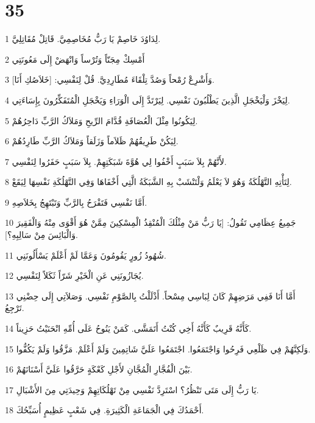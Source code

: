 \chapter{35}

\par 1 لِدَاوُدَ خَاصِمْ يَا رَبُّ مُخَاصِمِيَّ. قَاتِلْ مُقَاتِلِيَّ.
\par 2 أَمْسِكْ مِجَنّاً وَتُرْساً وَانْهَضْ إِلَى مَعُونَتِي
\par 3 وَأَشْرِعْ رُمْحاً وَصُدَّ تِلْقَاءَ مُطَارِدِيَّ. قُلْ لِنَفْسِي: [خَلاَصُكِ أَنَا].
\par 4 لِيَخْزَ وَلْيَخْجَلِ الَّذِينَ يَطْلُبُونَ نَفْسِي. لِيَرْتَدَّ إِلَى الْوَرَاءِ وَيَخْجَلِ الْمُتَفَكِّرُونَ بِإِسَاءَتِي.
\par 5 لِيَكُونُوا مِثْلَ الْعُصَافَةِ قُدَّامَ الرِّيحِ وَمَلاَكُ الرَّبِّ دَاحِرُهُمْ.
\par 6 لِيَكُنْ طَرِيقُهُمْ ظَلاَماً وَزَلَقاً وَمَلاَكُ الرَّبِّ طَارِدُهُمْ.
\par 7 لأَنَّهُمْ بِلاَ سَبَبٍ أَخْفُوا لِي هُوَّةَ شَبَكَتِهِمْ. بِلاَ سَبَبٍ حَفَرُوا لِنَفْسِي.
\par 8 لِتَأْتِهِ التَّهْلُكَةُ وَهُوَ لاَ يَعْلَمُ وَلْتَنْشَبْ بِهِ الشَّبَكَةُ الَّتِي أَخْفَاهَا وَفِي التَّهْلُكَةِ نَفْسِهَا لِيَقَعْ.
\par 9 أَمَّا نَفْسِي فَتَفْرَحُ بِالرَّبِّ وَتَبْتَهِجُ بِخَلاَصِهِ.
\par 10 جَمِيعُ عِظَامِي تَقُولُ: [يَا رَبُّ مَنْ مِثْلُكَ الْمُنْقِذُ الْمِسْكِينَ مِمَّنْ هُوَ أَقْوَى مِنْهُ وَالْفَقِيرَ وَالْبَائِسَ مِنْ سَالِبِهِ؟].
\par 11 شُهُودُ زُورٍ يَقُومُونَ وَعَمَّا لَمْ أَعْلَمْ يَسْأَلُونَنِي.
\par 12 يُجَازُونَنِي عَنِ الْخَيْرِ شَرّاً ثَكَلاً لِنَفْسِي.
\par 13 أَمَّا أَنَا فَفِي مَرَضِهِمْ كَانَ لِبَاسِي مِسْحاً. أَذْلَلْتُ بِالصَّوْمِ نَفْسِي. وَصَلاَتِي إِلَى حِضْنِي تَرْجِعُ.
\par 14 كَأَنَّهُ قَرِيبٌ كَأَنَّهُ أَخِي كُنْتُ أَتَمَشَّى. كَمَنْ يَنُوحُ عَلَى أُمِّهِ انْحَنَيْتُ حَزِيناً.
\par 15 وَلَكِنَّهُمْ فِي ظَلْعِي فَرِحُوا وَاجْتَمَعُوا. اجْتَمَعُوا عَلَيَّ شَاتِمِينَ وَلَمْ أَعْلَمْ. مَزَّقُوا وَلَمْ يَكُفُّوا.
\par 16 بَيْنَ الْفُجَّارِ الْمُجَّانِ لأَجْلِ كَعْكَةٍ حَرَّقُوا عَلَيَّ أَسْنَانَهُمْ.
\par 17 يَا رَبُّ إِلَى مَتَى تَنْظُرُ؟ اسْتَرِدَّ نَفْسِي مِنْ تَهْلُكَاتِهِمْ وَحِيدَتِي مِنَ الأَشْبَالِ.
\par 18 أَحْمَدُكَ فِي الْجَمَاعَةِ الْكَثِيرَةِ. فِي شَعْبٍ عَظِيمٍ أُسَبِّحُكَ.
